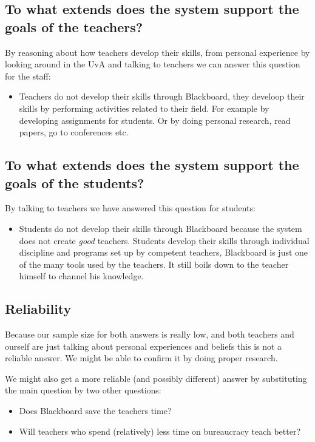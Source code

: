 \subsection{To what extends does the system support the goals of the teachers?}
By reasoning about how teachers develop their skills, from personal experience by looking around in the UvA and talking to teachers we can answer this question for the staff:
\begin{itemize}
	\item Teachers do not develop their skills through Blackboard, they develoop their skills by performing activities related to their field. For example by developing assignments for students. Or by doing personal research, read papers, go to conferences etc.
\end{itemize}

\subsection{To what extends does the system support the goals of the students?}

By talking to teachers we have answered this question for students:
\begin{itemize}
	\item Students do not develop their skills through Blackboard because the system does not create \emph{good} teachers. Students develop their skills through individual discipline and programs set up by competent teachers, Blackboard is just one of the many tools used by the teachers. It still boils down to the teacher himself to channel his knowledge.
\end{itemize}

\subsection{Reliability}
Because our sample size for both answers is really low, and both teachers and ourself are just talking about personal experiences and beliefs this is not a reliable answer. We might be able to confirm it by doing proper research. 

We might also get a more reliable (and possibly different) answer by substituting the main question by two other questions:
\begin{itemize}
	\item Does Blackboard save the teachers time?
	\item Will teachers who spend (relatively) less time on bureaucracy teach better?
\end{itemize}


